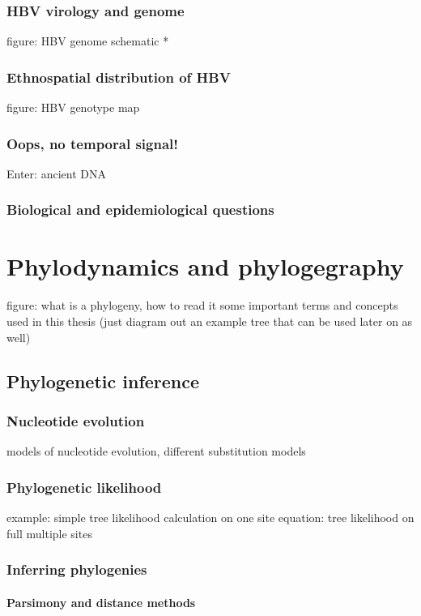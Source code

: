       \subsubsection{HBV virology and genome}
      figure: HBV genome schematic *
      \subsubsection{Ethnospatial distribution of HBV}
      figure: HBV genotype map
      \subsubsection{Oops, no temporal signal!}
      Enter: ancient DNA
      \subsubsection{Biological and epidemiological questions}

  \section{Phylodynamics and phylogegraphy}
  figure: what is a phylogeny, how to read it
  some important terms and concepts used in this thesis (just diagram out an example tree that can be used later on as well)

    \subsection{Phylogenetic inference}

      \subsubsection{Nucleotide evolution}
      models of nucleotide evolution, different substitution models
      \subsubsection{Phylogenetic likelihood}
      example: simple tree likelihood calculation on one site
      equation: tree likelihood on full multiple sites
      \subsubsection{Inferring phylogenies}
        \paragraph*{Parsimony and distance methods}
